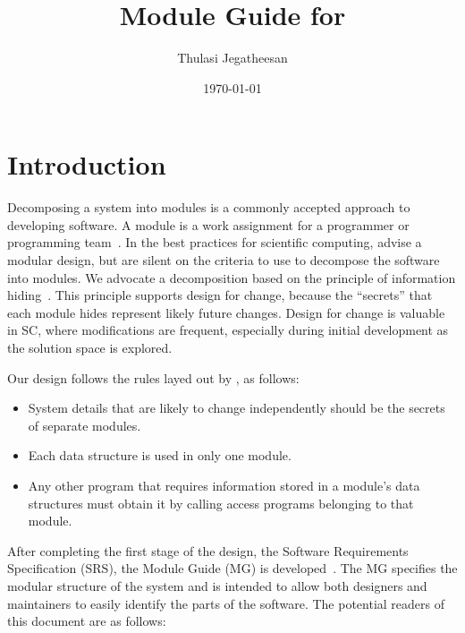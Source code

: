 \documentclass[12pt]{article}
\begin{document}
\title{Module Guide for } 
\author{Thulasi Jegatheesan}
\date{\today}
	
\maketitle

\tableofcontents

\newpage

\section{Introduction}

Decomposing a system into modules is a commonly accepted approach to developing
software.  A module is a work assignment for a programmer or programming
team~\citep{ParnasEtAl1984}.  In the best practices for scientific computing,
\citet{WilsonEtAl2013} advise a modular design, but are silent on the criteria
to use to decompose the software into modules.  We advocate a decomposition
based on the principle of information hiding~\citep{Parnas1972a}.  This
principle supports design for change, because the ``secrets'' that each module
hides represent likely future changes.  Design for change is valuable in SC,
where modifications are frequent, especially during initial development as the
solution space is explored.  

Our design follows the rules layed out by \citet{ParnasEtAl1984}, as follows:
\begin{itemize}
\item System details that are likely to change independently should be the
  secrets of separate modules.
\item Each data structure is used in only one module.
\item Any other program that requires information stored in a module's data
  structures must obtain it by calling access programs belonging to that module.
\end{itemize}

After completing the first stage of the design, the Software Requirements
Specification (SRS), the Module Guide (MG) is developed~\citep{ParnasEtAl1984}. The MG
specifies the modular structure of the system and is intended to allow both
designers and maintainers to easily identify the parts of the software.  The
potential readers of this document are as follows:
\end{document}
